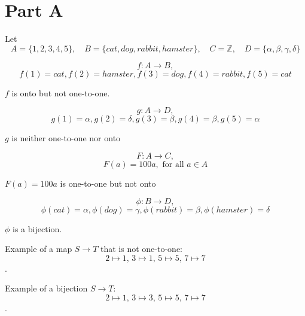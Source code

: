 \documentclass{tufte-handout}
\begin{document}

\section{Part A}

\begin{question}

Let \[ A = \{1,2,3,4,5\}, \quad B = \{cat,dog,rabbit,hamster\}, \quad C = \mathbb{Z}, \quad D = \{\alpha,\beta,\gamma,\delta\} \]

\qpart

\qsubpart

\[ f: A \rightarrow B, \]
\[ f(1)=cat, f(2)=hamster, f(3)=dog, f(4)=rabbit, f(5)=cat \]
    
 $f$ is onto but not one-to-one.
 
\vspace{2cm}

 \qsubpart

\[ g: A \rightarrow D, \]
\[ g(1)=\alpha, g(2)=\delta, g(3)=\beta, g(4)=\beta, g(5)=\alpha \]

 $g$ is neither one-to-one nor onto
 
\vspace{2cm}

 \qsubpart

 \[ F: A \rightarrow C, \]
\[ F(a) = 100a, \text{ for all } a \in A \]
 
 $F(a)=100a$ is one-to-one but not onto

\vspace{2cm} 

 \qsubpart

 \[ \phi: B \rightarrow D, \]
\[ \phi(cat)=\alpha, \phi(dog)=\gamma, \phi(rabbit)=\beta, \phi(hamster)=\delta \]

 $\phi$ is a bijection.

\vspace{5cm}

\qpart

\qsubpart

 Example of a map \( S\to T \) that is not one-to-one: \[ 2\mapsto 1,\,3\mapsto 1,\,5\mapsto 5,\,7\mapsto 7 \].\\[6pt]

\vspace{2cm}

 \qsubpart

 Example of a bijection \( S\to T \): \[ 2\mapsto 1,\,3\mapsto 3,\,5\mapsto 5,\,7\mapsto 7 \].

\end{question}
\end{document}
